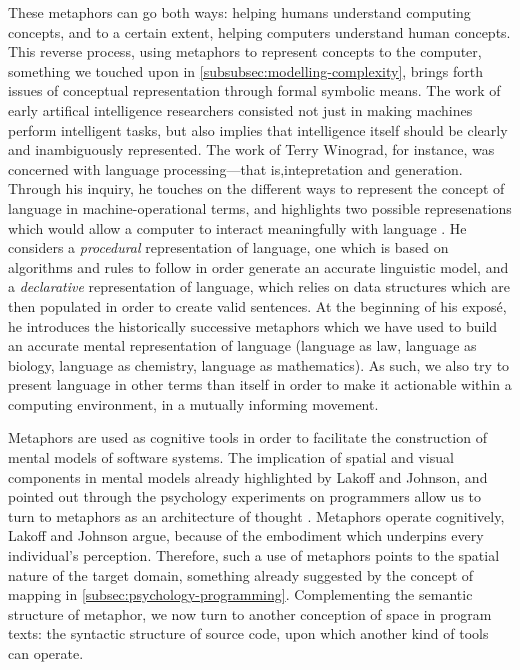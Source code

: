 These metaphors can go both ways: helping humans understand computing concepts, and to a certain extent, helping computers understand human concepts. This reverse process, using metaphors to represent concepts to the computer, something we touched upon in \autoref{subsubsec:modelling-complexity}, brings forth issues of conceptual representation through formal symbolic means. The work of early artifical intelligence researchers consisted not just in making machines perform intelligent tasks, but also implies that intelligence itself should be clearly and inambiguously represented. The work of Terry Winograd, for instance, was concerned with language processing—that is,intepretation and generation. Through his inquiry, he touches on the different ways to represent the concept of language in machine-operational terms, and highlights two possible represenations which would allow a computer to interact meaningfully with language  \citep{winograd_language_1982}. He considers a \emph{procedural} representation of language, one which is based on algorithms and rules to follow in order generate an accurate linguistic model, and a \emph{declarative} representation of language, which relies on data structures which are then populated in order to create valid sentences. At the beginning of his exposé, he introduces the historically successive metaphors which we have used to build an accurate mental representation of language (language as law, language as biology, language as chemistry, language as mathematics). As such, we also try to present language in other terms than itself in order to make it actionable within a computing environment, in a mutually informing movement.

Metaphors are used as cognitive tools in order to facilitate the construction of mental models of software systems. The implication of spatial and visual components in mental models already highlighted by Lakoff and Johnson, and pointed out through the psychology experiments on programmers allow us to turn to metaphors as an architecture of thought \citep{forsythe_cathedrals_1986}. Metaphors operate cognitively, Lakoff and Johnson argue, because of the embodiment which underpins every individual's perception. Therefore, such a use of metaphors points to the spatial nature of the target domain, something already suggested by the concept of mapping in \autoref{subsec:psychology-programming}. Complementing the semantic structure of metaphor, we now turn to another conception of space in program texts: the syntactic structure of source code, upon which another kind of tools can operate.

